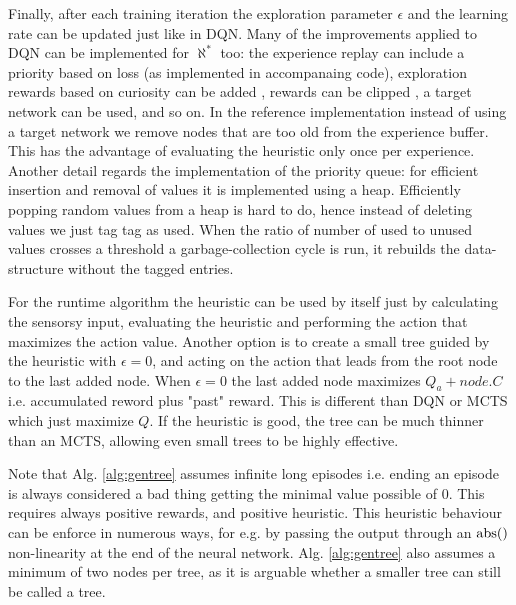 \documentclass{article}
\newcommand{\alephstar}{$\aleph^*$ }
\begin{document}
Finally, after each training iteration the exploration parameter $\epsilon$ and the learning rate can be updated just like in DQN. Many of the improvements applied to DQN can be implemented for \alephstar too: the experience replay can include a priority based on loss \cite{schaul2015prioritized} (as implemented in accompanaing code), exploration rewards based on curiosity can be added \cite{burda2018exploration}, rewards can be clipped \cite{pohlen2018observe}, a target network can be used, and so on. In the reference implementation instead of using a target network we remove nodes that are too old from the experience buffer. This has the advantage of evaluating the heuristic only once per experience. Another detail regards the implementation of the priority queue: for efficient insertion and removal of values it is implemented using a heap. Efficiently popping random values from a heap is hard to do, hence instead of deleting values we just tag tag as used. When the ratio of number of used to unused values crosses a threshold a garbage-collection cycle is run, it rebuilds the data-structure without the tagged entries.

For the runtime algorithm the heuristic can be used by itself just by calculating the sensorsy input, evaluating the heuristic and performing the action that maximizes the action value. Another option is to create a small tree guided by the heuristic with $\epsilon=0$, and acting on the action that leads from the root node to the last added node. When $\epsilon=0$ the last added node maximizes $Q_a + \mathit{node.C}$ i.e. accumulated reword plus "past" reward. This is different than DQN or MCTS which just maximize $Q$. If the heuristic is good, the tree can be much thinner than an MCTS, allowing even small trees to be highly effective.

Note that Alg. \ref{alg:gentree} assumes infinite long episodes i.e. ending an episode is always considered a bad thing getting the minimal value possible of $0$. This requires always positive rewards, and positive heuristic. This heuristic behaviour can be enforce in numerous ways, for e.g. by passing the output through an $\rm abs()$ non-linearity at the end of the neural network. Alg. \ref{alg:gentree} also assumes a minimum of two nodes per tree, as it is arguable whether a smaller tree can still be called a tree.
\end{document}
